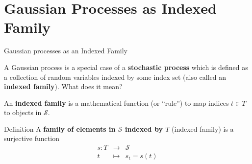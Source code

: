 \documentclass[11pt,compress,t,notes=noshow, xcolor=table]{beamer}
\begin{document}
\section{Gaussian Processes as Indexed Family}




\begin{vbframe}{Gaussian processes as an Indexed Family}



A Gaussian process is a special case of a \textbf{stochastic process} which is defined as a collection of random variables indexed by some index set (also called an \textbf{indexed family}). What does it mean? 

\lz 

An \textbf{indexed family} is a mathematical function (or \enquote{rule}) to map indices $t \in T$ to objects in $\mathcal{S}$. 

\begin{block}{Definition}
A \textbf{family of elements in $\mathcal{S}$ indexed by $T$} (indexed family) is a surjective function 
\vspace*{-0.3cm}
\begin{eqnarray*}
s: T &\to& \mathcal{S} \\
   t &\mapsto& s_t = s(t) 
\end{eqnarray*}
\end{block}

\end{vbframe}
\end{document}

